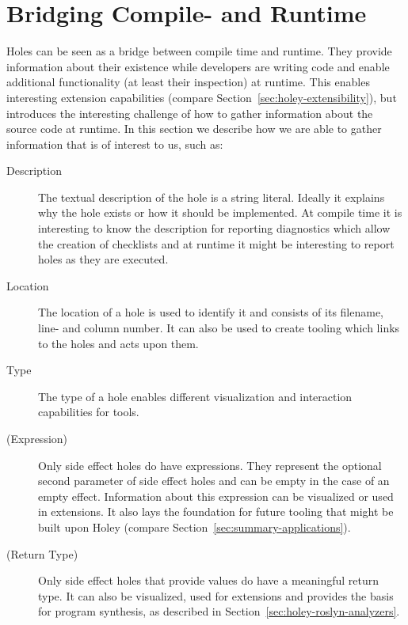 \section{Bridging Compile- and Runtime}
\label{sec:holey-bridging-compile-and-runtime}
Holes can be seen as a bridge between compile time and runtime.
They provide information about their existence while developers are writing code and enable additional functionality (at least their inspection) at runtime.
This enables interesting extension capabilities (compare Section~\ref{sec:holey-extensibility}), but introduces the interesting challenge of how to gather information about the source code at runtime.
In this section we describe how we are able to gather information that is of interest to us, such as:
\begin{description}
    \item[Description] The textual description of the hole is a string literal. Ideally it explains why the hole exists or how it should be implemented. At compile time it is interesting to know the description for reporting diagnostics which allow the creation of checklists and at runtime it might be interesting to report holes as they are executed.
    \item[Location] The location of a hole is used to identify it and consists of its filename, line- and column number. It can also be used to create tooling which links to the holes and acts upon them.
    \item[Type] The type of a hole enables different visualization and interaction capabilities for tools.
    \item[(Expression)] Only side effect holes do have expressions. They represent the optional second parameter of side effect holes and can be empty in the case of an empty effect. Information about this expression can be visualized or used in extensions. It also lays the foundation for future tooling that might be built upon Holey (compare Section~\ref{sec:summary-applications}).
    \item[(Return Type)] Only side effect holes that provide values do have a meaningful return type. It can also be visualized, used for extensions and provides the basis for program synthesis, as described in Section~\ref{sec:holey-roslyn-analyzers}.
\end{description}

